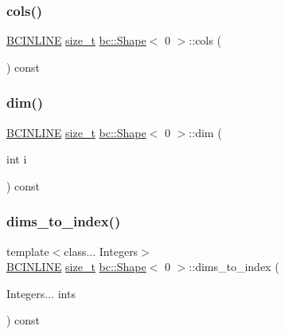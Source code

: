 \mbox{\label{structbc_1_1Shape_3_010_01_4_ad75ea2c1eb656ad3dc0dda5617729ade}} 
\subsubsection{\texorpdfstring{cols()}{cols()}}
{\footnotesize\ttfamily \hyperlink{common_8h_a6699e8b0449da5c0fafb878e59c1d4b1}{B\+C\+I\+N\+L\+I\+NE} \hyperlink{structbc_1_1Shape_3_010_01_4_a7bf4db55cfc575f40871044048ea5c03}{size\+\_\+t} \hyperlink{structbc_1_1Shape}{bc\+::\+Shape}$<$ 0 $>$\+::cols (\begin{DoxyParamCaption}{ }\end{DoxyParamCaption}) const\hspace{0.3cm}{\ttfamily [inline]}}

\mbox{\label{structbc_1_1Shape_3_010_01_4_a89145b68ee349bdfa91e9eecce813c85}} 
\subsubsection{\texorpdfstring{dim()}{dim()}}
{\footnotesize\ttfamily \hyperlink{common_8h_a6699e8b0449da5c0fafb878e59c1d4b1}{B\+C\+I\+N\+L\+I\+NE} \hyperlink{structbc_1_1Shape_3_010_01_4_a7bf4db55cfc575f40871044048ea5c03}{size\+\_\+t} \hyperlink{structbc_1_1Shape}{bc\+::\+Shape}$<$ 0 $>$\+::dim (\begin{DoxyParamCaption}\item[{int}]{i }\end{DoxyParamCaption}) const\hspace{0.3cm}{\ttfamily [inline]}}

\mbox{\label{structbc_1_1Shape_3_010_01_4_a71aefca6058972cb28a296ec4f838ed6}} 
\subsubsection{\texorpdfstring{dims\+\_\+to\+\_\+index()}{dims\_to\_index()}}
{\footnotesize\ttfamily template$<$class... Integers$>$ \\
\hyperlink{common_8h_a6699e8b0449da5c0fafb878e59c1d4b1}{B\+C\+I\+N\+L\+I\+NE} \hyperlink{structbc_1_1Shape_3_010_01_4_a7bf4db55cfc575f40871044048ea5c03}{size\+\_\+t} \hyperlink{structbc_1_1Shape}{bc\+::\+Shape}$<$ 0 $>$\+::dims\+\_\+to\+\_\+index (\begin{DoxyParamCaption}\item[{Integers...}]{ints }\end{DoxyParamCaption}) const\hspace{0.3cm}{\ttfamily [inline]}}

